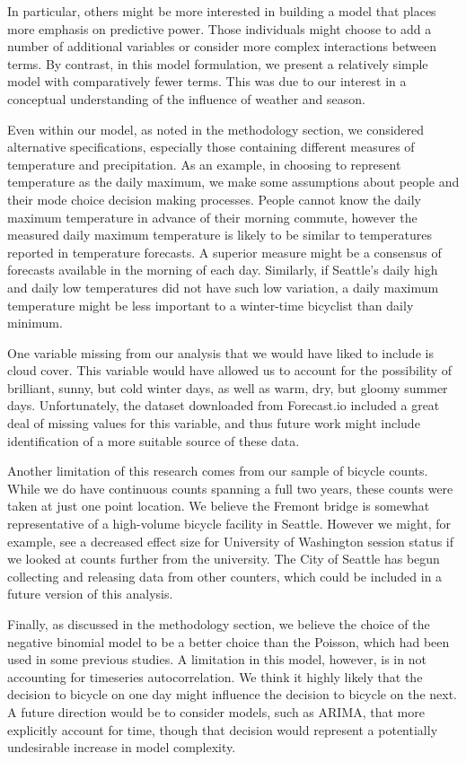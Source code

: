\documentclass[12pt,letterpaper,article]{memoir}
\begin{document}
In particular, others might be more interested in building a model
that places more emphasis on predictive power. Those individuals might
choose to add a number of additional variables or consider more
complex interactions between terms. By contrast, in this model
formulation, we present a relatively simple model with comparatively
fewer terms. This was due to our interest in a conceptual
understanding of the influence of weather and season.

Even within our model, as noted in the methodology section, we
considered alternative specifications, especially those containing
different measures of temperature and precipitation. As an example, in
choosing to represent temperature as the daily maximum, we make some
assumptions about people and their mode choice decision making
processes. People cannot know the daily maximum temperature in advance
of their morning commute, however the measured daily maximum
temperature is likely to be similar to temperatures reported in
temperature forecasts. A superior measure might be a consensus of
forecasts available in the morning of each day. Similarly, if
Seattle's daily high and daily low temperatures did not have such low
variation, a daily maximum temperature might be less important to a
winter-time bicyclist than daily minimum.

One variable missing from our analysis that we would have liked to
include is cloud cover. This variable would have allowed us to account
for the possibility of brilliant, sunny, but cold winter days, as well
as warm, dry, but gloomy summer days. Unfortunately, the dataset
downloaded from Forecast.io included a great deal of missing values
for this variable, and thus future work might include identification
of a more suitable source of these data.

Another limitation of this research comes from our sample of bicycle
counts. While we do have continuous counts spanning a full two years,
these counts were taken at just one point location. We believe the
Fremont bridge is somewhat representative of a high-volume bicycle
facility in Seattle. However we might, for example, see a decreased
effect size for University of Washington session status if we looked
at counts further from the university. The City of Seattle has begun
collecting and releasing data from other counters, which could be
included in a future version of this analysis.

Finally, as discussed in the methodology section, we believe the
choice of the negative binomial model to be a better choice than the
Poisson, which had been used in some previous studies. A limitation in
this model, however, is in not accounting for timeseries
autocorrelation. We think it highly likely that the decision to
bicycle on one day might influence the decision to bicycle on the
next. A future direction would be to consider models, such as ARIMA,
that more explicitly account for time, though that decision would
represent a potentially undesirable increase in model complexity.
\end{document}
